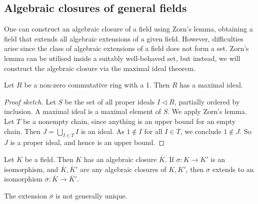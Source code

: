 \subsection{Algebraic closures of general fields}
One can construct an algebraic closure of a field using Zorn's lemma, obtaining a field that extends all algebraic extensions of a given field.
However, difficulties arise since the class of algebraic extensions of a field does not form a set.
Zorn's lemma can be utilised inside a suitably well-behaved set, but instead, we will construct the algebraic closure via the maximal ideal theorem.
\begin{theorem}
	Let \( R \) be a non-zero commutative ring with a 1.
	Then \( R \) has a maximal ideal.
\end{theorem}
\begin{proof}[Proof sketch]
	Let \( S \) be the set of all proper ideals \( I \vartriangleleft R \), partially ordered by inclusion.
	A maximal ideal is a maximal element of \( S \).
	We apply Zorn's lemma.
	Let \( T \) be a nonempty chain, since anything is an upper bound for an empty chain.
	Then \( J = \bigcup_{I \in T} I \) is an ideal.
	As \( 1 \not\in I \) for all \( I \in T \), we conclude \( 1 \not\in J \).
	So \( J \) is a proper ideal, and hence is an upper bound.
\end{proof}
\begin{theorem}
	Let \( K \) be a field.
	Then \( K \) has an algebraic closure \( \overline K \).
	If \( \sigma \colon K \to K' \) is an isomorphism, and \( \overline K, \overline K' \) are any algebraic closures of \( K, K' \), then \( \sigma \) extends to an isomorphism \( \overline \sigma \colon \overline K \to \overline K' \).
\end{theorem}
\begin{remark}
	The extension \( \overline \sigma \) is not generally unique.
\end{remark}
